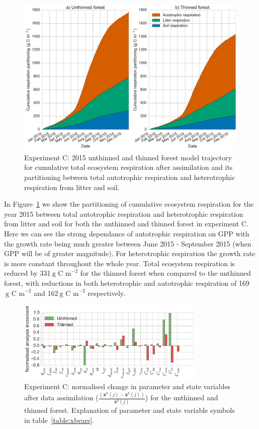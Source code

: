 \begin{figure}[ht]
    \centering
        \includegraphics[width=\textwidth]{chapter/chapter7/resp_partc.pdf}
    \caption{Experiment C: 2015 unthinned and thinned forest model trajectory for cumulative total ecosystem respiration after assimilation and its partitioning between total autotrophic respiration and heterotrophic respiration from litter and soil.} \label{fig:rt_part}
\end{figure}

In Figure~\ref{fig:rt_part} we show the partitioning of cumulative ecosystem respiration for the year 2015 between total autotrophic respiration and heterotrophic respiration from litter and soil for both the unthinned and thinned forest in experiment C. Here we can see the strong dependance of autotrophic respiration on GPP with the growth rate being much greater between June 2015 - September 2015 (when GPP will be of greater magnitude). For heterotrophic respiration the growth rate is more constant throughout the whole year. Total ecosystem respiration is reduced by 331\(~\text{g C m}^{-2}\) for the thinned forest when compared to the unthinned forest, with reductions in both heterotrophic and autotrophic respiration of 169\(~\text{g C m}^{-2}\) and 162\(~\text{g C m}^{-2}\) respectively.    

\begin{figure}[ht]
    \centering
    \includegraphics[width=0.8\textwidth]{chapter/chapter7/xa_incc.pdf}
    \caption{Experiment C: normalised change in parameter and state variables after data assimilation \big($\frac{(\textbf{x}^a(j) - \textbf{x}^b(j))}{\textbf{x}^b(j)}$\big) for the unthinned and thinned forest. Explanation of parameter and state variable symbols in table~\ref{table:xbvars}.}
    \label{fig:xa_inc}
\end{figure}

